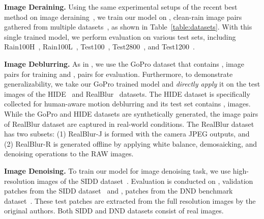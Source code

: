 \documentclass[10pt,twocolumn,letterpaper]{article}
\begin{document}
\begin{table*}
\begin{center}
{\begin{tabular}{l c c c c c c c c c c || c c}
\bottomrule[0.1em]
\end{tabular}}
\end{center}\vspace{-1.3em}
\end{table*}






\vspace{0.4em}\noindent\textbf{Image Deraining.}
Using the same experimental setups of the recent best method on image deraining~\cite{mspfn2020}, we train our model on , clean-rain image pairs gathered from multiple datasets~\cite{fu2017removing,li2016rain,yang2017deep,zhang2018density,zhang2019image}, as shown in Table~\ref{table:datasets}. 
With this single trained model, we perform evaluation on various test sets, including Rain100H~\cite{yang2017deep}, Rain100L~\cite{yang2017deep}, Test100~\cite{zhang2019image}, Test2800~\cite{fu2017removing}, and Test1200~\cite{zhang2018density}.


\vspace{0.4em}\noindent\textbf{Image Deblurring.}
As in \cite{Maitreya2020, dmphn2019, deblurganv2, tao2018scale}, we use the GoPro \cite{gopro2017} dataset that contains , image pairs for training and , pairs for evaluation.
Furthermore, to demonstrate generalizability, we take our GoPro trained model and \emph{directly apply} it on the test images of the  HIDE~\cite{shen2019human} and RealBlur~\cite{rim_2020_realblur} datasets. 
The HIDE dataset is specifically collected for human-aware motion deblurring and its test set contains , images. 
While the GoPro and HIDE datasets are synthetically generated, the image pairs of RealBlur dataset are captured in real-world conditions. 
The RealBlur dataset has two subsets: (1) RealBlur-J is formed with the camera JPEG outputs, and (2) RealBlur-R is generated offline by applying white balance, demosaicking, and denoising operations to the RAW images.




\vspace{0.4em}\noindent\textbf{Image Denoising.}
To train our model for image denoising task, we use  high-resolution images of the SIDD dataset~\cite{sidd}. 
Evaluation is conducted on , validation patches from the SIDD dataset~\cite{sidd} and , patches from the DND benchmark dataset~\cite{dnd}. 
These test patches are extracted from the full resolution images by the original authors. 
Both SIDD and DND datasets consist of real images. 
\end{document}
